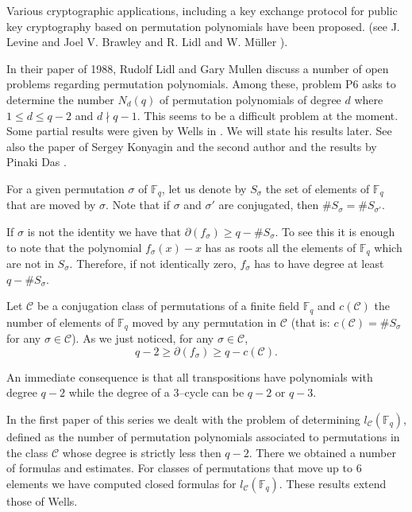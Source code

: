 \documentclass[a4paper,twoside]{article}
\begin{document}
Various cryptographic applications, including a key
exchange protocol for public key cryptography based on permutation polynomials have been
proposed.
(see J. Levine and Joel V. Brawley \cite{LB} and R. Lidl and W. M\"uller \cite{LMu}).

In their paper of 1988, Rudolf Lidl and Gary Mullen \cite{LM1}
discuss a number of open problems regarding permutation
polynomials. Among these, problem P6 asks to determine the number
$N_d(q)$ of permutation polynomials of degree $d$ where $1\leq
d\leq q-2$ and $d\nmid q-1$. This seems to be a difficult problem
at the moment. Some partial results were given by Wells in
\cite{W}. We will state his results later. See also the paper of
Sergey Konyagin and the second author \cite{KP} and the results by
Pinaki Das \cite{Das}.

For a given permutation $\sigma$ of $\mathbb F_q$, let us denote by
$S_\sigma$ the set of elements of $\mathbb F_q$ that are moved by $\sigma$. Note that
if $\sigma$ and $\sigma'$ are conjugated, then $\#S_\sigma=\# S_{\sigma'}$.

If $\sigma$ is not the identity we have that $\partial(f_\sigma)\geq q-\#S_\sigma$.
To see this it is enough to note that the polynomial $f_\sigma(x)-x$ has as roots all the elements
of $\mathbb F_q$ which are not in $S_\sigma$. Therefore, if not identically zero, $f_\sigma$ has to have degree at
least $q-\#S_\sigma$.

Let $\mathcal C$ be a conjugation class of permutations of a finite field $\mathbb F_q$ and
$c(\mathcal C)$ the number of elements of $\mathbb F_q$ moved by any permutation in $\mathcal C$
(that is: $c(\mathcal C)=\#S_\sigma$ for any $\sigma\in \mathcal C$).
As we just noticed, for any $\sigma\in\mathcal C$,
\begin{equation}\label{degfund}
q-2\geq \partial(f_\sigma)\geq q-c(\mathcal C).
\end{equation}

An immediate consequence is that all transpositions have polynomials
with degree $q-2$ while the degree of a $3$--cycle can be $q-2$ or $q-3$.

In the first paper of this series \cite{CP} we dealt
with the problem of determining $l_{\mathcal C}(\mathbb F_q)$,
defined as the number of permutation polynomials associated to permutations
in the class $\mathcal C$ whose degree is strictly less then $q-2$.
There we obtained a number of formulas and estimates. For classes of permutations
that move up to 6 elements we have computed closed formulas for $l_{\mathcal C}(\mathbb F_q)$.
These results extend those of Wells.
\end{document}
